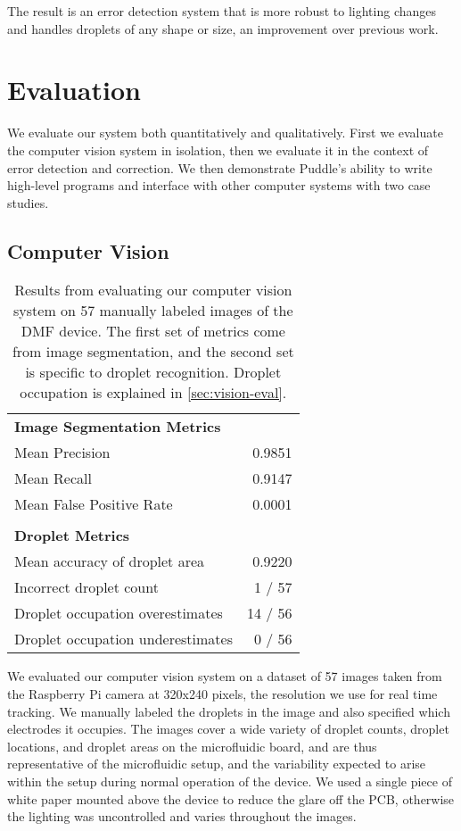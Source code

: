 \documentclass[sigconf, screen]{acmart}
\begin{document}
The result is an error detection system that is more robust to lighting changes and handles droplets of any shape or size, an improvement over previous work.


\section{Evaluation}
\label{sec:eval}

We evaluate our system both quantitatively and qualitatively.
First we evaluate the computer vision system in isolation, then we evaluate it in the context of error detection and correction.
We then demonstrate Puddle's ability to write high-level programs and interface with other computer systems with two case studies.

\subsection{Computer Vision}
\label{sec:vision-eval}

\begin{table}
  \centering
  \begin{tabular}{lr}
    \bf Image Segmentation Metrics \\
    Mean Precision & 0.9851 \\
    Mean Recall & 0.9147 \\
    Mean False Positive Rate & 0.0001 \\
    \\
    \bf Droplet Metrics \\
    Mean accuracy of droplet area & 0.9220  \\
    Incorrect droplet count & 1 / 57 \\
    Droplet occupation overestimates & 14 / 56 \\
    Droplet occupation underestimates & 0 / 56 \\
  \end{tabular}
  \caption{
    Results from evaluating our computer vision system on 57 manually labeled images of the DMF device.
    The first set of metrics come from image segmentation, and the second set is specific to droplet recognition.
    Droplet occupation is explained in \autoref{sec:vision-eval}.
  }
  \label{tab:vision-results}
\end{table}

We evaluated our computer vision system on a dataset of 57 images taken from the Raspberry Pi camera at 320x240 pixels, the resolution we use for real time tracking.
We manually labeled the droplets in the image and also specified which electrodes it occupies.
The images cover a wide variety of droplet counts, droplet locations, and droplet areas on the microfluidic board, and are thus representative of the microfluidic setup, and the variability expected to arise within the setup during normal operation of the device.
We used a single piece of white paper mounted above the device to reduce the glare off the PCB, otherwise the lighting was uncontrolled and varies throughout the images.
\end{document}
